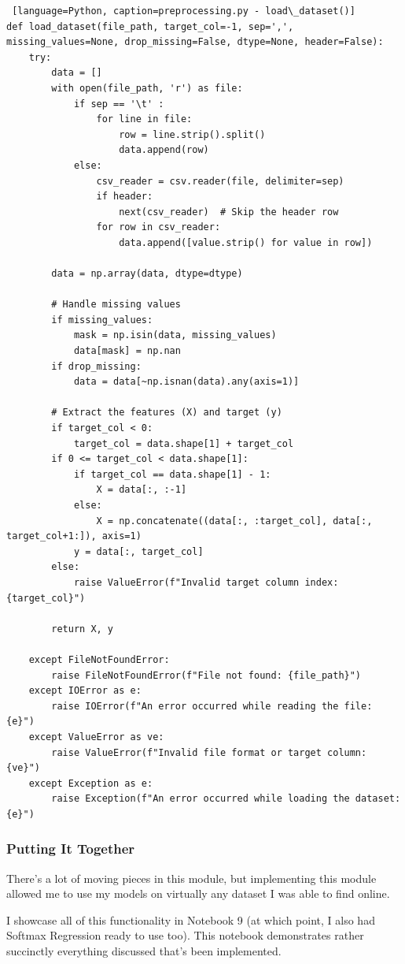 \documentclass[letterpaper,10pt]{article}
\begin{document}
\begin{lstlisting} [language=Python, caption=preprocessing.py - load\_dataset()] 
def load_dataset(file_path, target_col=-1, sep=',', missing_values=None, drop_missing=False, dtype=None, header=False):
    try:
        data = []
        with open(file_path, 'r') as file:
            if sep == '\t' :
                for line in file:
                    row = line.strip().split()
                    data.append(row)
            else:
                csv_reader = csv.reader(file, delimiter=sep)
                if header:
                    next(csv_reader)  # Skip the header row
                for row in csv_reader:
                    data.append([value.strip() for value in row])

        data = np.array(data, dtype=dtype)

        # Handle missing values
        if missing_values:
            mask = np.isin(data, missing_values)
            data[mask] = np.nan
        if drop_missing:
            data = data[~np.isnan(data).any(axis=1)]

        # Extract the features (X) and target (y)
        if target_col < 0:
            target_col = data.shape[1] + target_col
        if 0 <= target_col < data.shape[1]:
            if target_col == data.shape[1] - 1:
                X = data[:, :-1]
            else:
                X = np.concatenate((data[:, :target_col], data[:, target_col+1:]), axis=1)
            y = data[:, target_col]
        else:
            raise ValueError(f"Invalid target column index: {target_col}")

        return X, y

    except FileNotFoundError:
        raise FileNotFoundError(f"File not found: {file_path}")
    except IOError as e:
        raise IOError(f"An error occurred while reading the file: {e}")
    except ValueError as ve:
        raise ValueError(f"Invalid file format or target column: {ve}")
    except Exception as e:
        raise Exception(f"An error occurred while loading the dataset: {e}")

\end{lstlisting}

\subsubsection{Putting It Together}
There's a lot of moving pieces in this module, but implementing this module allowed me to use my models on virtually any dataset I was able to find online. \par
I showcase all of this functionality in Notebook 9 (at which point, I also had Softmax Regression ready to use too). This notebook demonstrates rather succinctly everything discussed that's been implemented. \par
\end{document}
